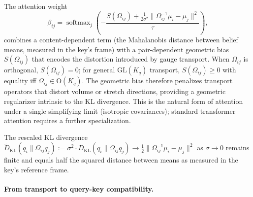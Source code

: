 \documentclass[11pt]{article}
\begin{document}
The attention weight
\begin{equation}
\beta_{ij} = \operatorname{softmax}_j\left(-\frac{S(\Omega_{ij}) + \frac{1}{2\sigma^2}\|\Omega_{ij}^{-1}\mu_i - \mu_j\|^2}{\tau}\right),
\end{equation}
combines a content-dependent term (the Mahalanobis distance between belief means, measured in the key's frame) with a pair-dependent geometric bias $S(\Omega_{ij})$ that encodes the distortion introduced by gauge transport. When $\Omega_{ij}$ is orthogonal, $S(\Omega_{ij}) = 0$; for general $\mathrm{GL}(K_q)$ transport, $S(\Omega_{ij}) \geq 0$ with equality iff $\Omega_{ij} \in \mathrm{O}(K_q)$. The geometric bias therefore penalizes transport operators that distort volume or stretch directions, providing a geometric regularizer intrinsic to the KL divergence. This is the natural form of attention under a single simplifying limit (isotropic covariances); standard transformer attention requires a further specialization.

The rescaled KL divergence $\widetilde{D}_{\mathrm{KL}}(q_i \| \Omega_{ij}q_j) := \sigma^2 \cdot D_{\mathrm{KL}}(q_i \| \Omega_{ij}q_j) \to \frac{1}{2}\|\Omega_{ij}^{-1}\mu_i - \mu_j\|^2$ as $\sigma \to 0$ remains finite and equals half the squared distance between means as measured in the key's reference frame.

\paragraph{From transport to query-key compatibility.}
\end{document}
